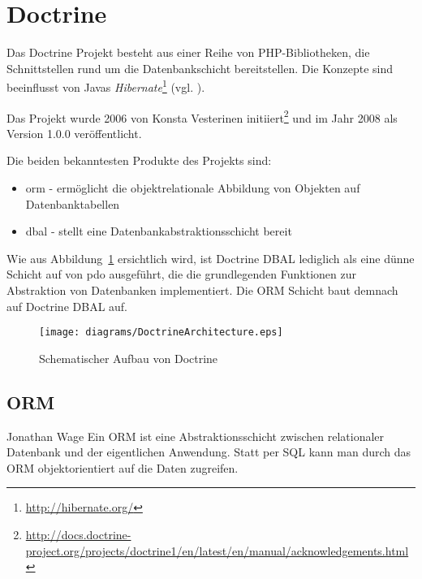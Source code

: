 \section{Doctrine}
\label{basics:sec:doctrine}
Das Doctrine Projekt besteht aus einer Reihe von PHP-Bibliotheken, die Schnittstellen rund um die Datenbankschicht bereitstellen. Die Konzepte sind beeinflusst von Javas \textit{Hibernate}\footnote{\url{http://hibernate.org/}} (vgl. \cite{web:t3nDoctrine2009}).

Das Projekt wurde 2006 von Konsta Vesterinen initiiert\footnote{\url{http://docs.doctrine-project.org/projects/doctrine1/en/latest/en/manual/acknowledgements.html}} und im Jahr 2008 als Version 1.0.0 veröffentlicht.

Die beiden bekanntesten Produkte des Projekts sind:
\begin{itemize}
	\item \gls{orm} - ermöglicht die objektrelationale Abbildung von Objekten auf Datenbanktabellen
	\item \gls{dbal} - stellt eine Datenbankabstraktionsschicht bereit
\end{itemize}

Wie aus Abbildung~\ref{fig:doctrineArchitecture} ersichtlich wird, ist Doctrine DBAL lediglich als eine dünne Schicht auf von \gls{pdo} ausgeführt, die die grundlegenden Funktionen zur Abstraktion von Datenbanken implementiert. Die ORM Schicht baut demnach auf Doctrine DBAL auf.

\begin{figure}[H]
    \centering
    \texttt{[image: diagrams/DoctrineArchitecture.eps]}
    \caption{Schematischer Aufbau von Doctrine}
    \label{fig:doctrineArchitecture}
\end{figure}

\subsection{ORM}
\label{basics:doctrine:subsec:orm}
\begin{shadequote}[l]{Jonathan Wage \cite{web:t3nDoctrine2009}}
	Ein ORM ist eine Abstraktionsschicht zwischen relationaler Datenbank und der eigentlichen Anwendung. Statt per SQL kann man durch das ORM objektorientiert auf die Daten zugreifen.
\end{shadequote}


